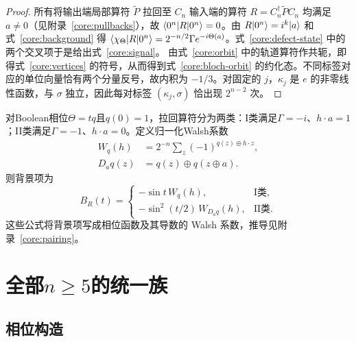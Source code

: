 \begin{proof}
所有将输出端局部算符 $\widetilde P$ 拉回至 $C_n$ 输入端的算符 $R=C_n^\dagger\widetilde P C_n$ 均满足 $a\ne0$（见附录~\ref{core:pullbacks}），故 $\langle 0^n\rvert R\lvert 0^n\rangle=0$。由 $R\lvert 0^n\rangle=i^k\lvert a\rangle$ 和式~\eqref{core:background} 得 $\langle \chi_\Theta\rvert R\lvert 0^n\rangle=2^{-n/2}\Gamma e^{-i\Theta(a)}$。式~\eqref{core:defect-state} 中的两个交叉项于是给出式~\eqref{core:signal}。
由式~\eqref{core:orbit} 中的轨道算符作共轭，即得式~\eqref{core:vertices} 的符号，从而得到式~\eqref{core:bloch-orbit} 的约化态。不同标签对应的单位向量恰有两个分量反号，故内积为 $-1/3$。对固定的 $j$，$\kappa_j$ 是 $e$ 的非零线性函数，与 $\sigma$ 独立，因此每对标签 $(\kappa_j,\sigma)$ 恰出现 $2^{n-2}$ 次。
\end{proof}

对Boolean相位$\Theta=tq$且$q(0)=1$，拉回算符分为两类：I类满足$\Gamma=-i$、$h\cdot a=1$；II类满足$\Gamma=-1$、$h\cdot a=0$。定义归一化Walsh系数
\begin{equation}
 \begin{aligned}
 W_q(h)&=2^{-n}\sum_z(-1)^{q(z)\oplus h\cdot z},\\
 D_aq(z)&=q(z)\oplus q(z\oplus a).
 \end{aligned}
 \label{core:walsh-def}
\end{equation}
则背景项为
\begin{equation}
 B_R(t)=\begin{cases}
 -\sin t\,W_q(h),&\text{I类},\\
 -\sin^2(t/2)\,W_{D_aq}(h),&\text{II类}.
 \end{cases}
 \label{core:boolean-background}
\end{equation}
这些公式将背景项写成相位函数及其导数的 Walsh 系数，推导见附录~\ref{core:pairing}。

\section{全部\texorpdfstring{$n\ge5$}{n >= 5}的统一族}
\label{core:unified}

\subsection{相位构造}

